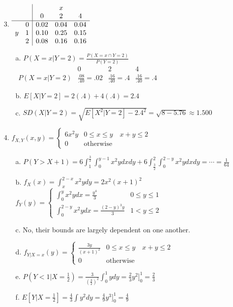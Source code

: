 \documentclass[11pt]{amsart}
\theoremstyle{definition}
\begin{document}
\begin{itemize}
\item[3.]$\begin{array}{cc|ccc}
&&&x&\\
&&0&2&4\\
\hline
  &0 &0.02 &0.04 &0.04\\
y &1 &0.10 &0.25 &0.15\\
  &2 &0.08 &0.16 &0.16
\end{array}$
\begin{itemize}
	\item[a.] $P(X=x|Y=2)=\frac{P(X=x\cap Y=2)}{P(Y=2)}$\\
			  $\begin{array}{c|ccc}
			  			 &0 &2 &4 \\\hline
			  P(X=x|Y=2) &\frac{.08}{.40}=.02 &\frac{.16}{.40}=.4 &\frac{.16}{.40}=.4
			  \end{array}$

	\item[b.] $E[X|Y=2]=2(.4)+4(.4)=2.4$

	\item[c.] $SD(X|Y=2)=\sqrt{E[X^2|Y=2]-2.4^2}=\sqrt{8-5.76}\approx1.500$

\end{itemize}

\item[4.] $f_{X,Y}(x,y)=\begin{cases}
	6x^2y &0\le x\le y\quad x+y\le 2\\
	0 &\text{otherwise}
\end{cases}$
\begin{itemize}
	\item[a.] $P(Y>X+1)=6\int_1^\frac32\int_0^{y-1}x^2ydxdy+6\int_\frac32^2\int_0^{2-y}x^2ydxdy=\cdots=\frac1{64}$

	\item[b.] $f_X(x)=\int_x^{2-x}x^2ydy=2x^2(x+1)^2$ \\
			  $f_Y(y)=\begin{cases}
				  \int_0^yx^2ydx=\frac{y^4}3 &0\le y\le 1\\
				  \int_0^{2-y}x^2ydx=\frac{(2-y)^3y}3 &1<y\le 2
			  \end{cases}$

    \item[c.] No, their bounds are largely dependent on one another.

	\item[d.] $f_{Y|X=x}(y)=\begin{cases}
				  \frac{3y}{(x+1)^2} &0\le x\le y\quad x+y\le 2\\
				  0 &\text{otherwise}
			  \end{cases}$

		  \item[e.] $P(Y<1|X=\frac12)=\frac3{(\frac32)^2}\int_0^1ydy=\frac23y^2]_0^1=\frac23$

		  \item[f.] $E[Y|X=\frac12]=\frac43\int y^2dy=\frac49 y^3]_0^1=\frac49$
    
\end{itemize}

\end{itemize}
\end{document}
